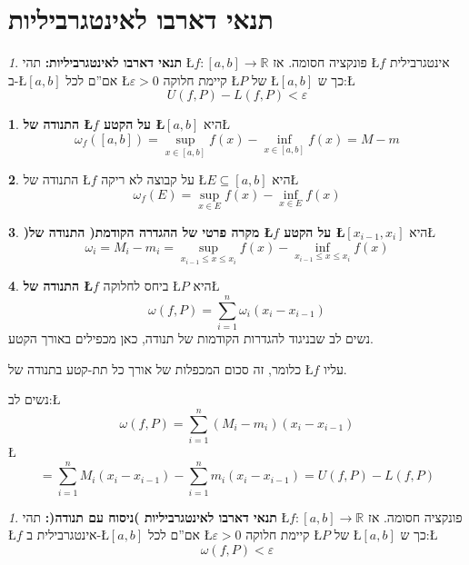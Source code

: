 \documentclass[english,hebrew]{article}
\theoremstyle{remark}
\theoremstyle{definition}
\newtheorem*{defn*}{\protect\definitionname}
\theoremstyle{plain}
\theoremstyle{remark}
\newtheorem{claim}[thm]{\protect\claimname}
\theoremstyle{plain}
\theoremstyle{plain}
\providecommand{\claimname}{טענה}
\providecommand{\definitionname}{הגדרה}
\begin{document}
\section{תנאי דארבו לאינטגרביליות}
\begin{claim}
\textbf{תנאי דארבו לאינטגרביליות: }תהי \L{$f:\left[a,b\right]\rightarrow\mathbb{R}$}
פונקציה חסומה. אז \L{$f$} אינטגרבילית ב-\L{$\left[a,b\right]$} אם\textquotedblright ם
לכל \L{$\varepsilon>0$} קיימת חלוקה \L{$P$} של \L{$\left[a,b\right]$}
כך ש:\L{%
\[
U\left(f,P\right)-L\left(f,P\right)<\varepsilon
\]
}%
\end{claim}

\begin{defn*}
\textbf{התנודה של \L{$f$} על הקטע \L{$\left[a,b\right]$}} היא\L{%
\[
\omega_{f}\left(\left[a,b\right]\right)=\underset{x\in\left[a,b\right]}{\sup}f(x)-\underset{x\in\left[a,b\right]}{\inf}f(x)=M-m
\]
}%
\end{defn*}
\begin{defn*}
התנודה של \L{$f$} על קבוצה לא ריקה \L{$E\subseteq\left[a,b\right]$}
היא\L{%
\[
\omega_{f}\left(E\right)=\underset{x\in E}{\sup}f(x)-\underset{x\in E}{\inf}f(x)
\]
}%
\end{defn*}
\begin{defn*}
\textbf{)מקרה פרטי של ההגדרה הקודמת( התנודה של \L{$f$} על הקטע \L{$\left[x_{i-1},x_{i}\right]$}}
היא\L{%
\[
\omega_{i}=M_{i}-m_{i}=\underset{x_{i-1}\le x\le x_{i}}{\sup}f(x)-\underset{x_{i-1}\le x\le x_{i}}{\inf}f(x)
\]
}%
\end{defn*}
\begin{defn*}
\textbf{התנודה של \L{$f$} }ביחס לחלוקה \L{$P$} היא\L{%
\[
\omega\left(f,P\right)=\underset{i=1}{\overset{n}{\sum}}\omega_{i}\left(x_{i}-x_{i-1}\right)
\]
}%
נשים לב שבניגוד להגדרות הקודמות של תנודה, כאן מכפילים באורך הקטע.

כלומר, זה סכום המכפלות של אורך כל תת-קטע בתנודה של \L{$f$} עליו.

נשים לב:\L{%
\[
\omega\left(f,P\right)=\underset{i=1}{\overset{n}{\sum}}\left(M_{i}-m_{i}\right)\left(x_{i}-x_{i-1}\right)
\]
}%
\L{%
\[
=\underset{i=1}{\overset{n}{\sum}}M_{i}\left(x_{i}-x_{i-1}\right)-\underset{i=1}{\overset{n}{\sum}}m_{i}\left(x_{i}-x_{i-1}\right)=U\left(f,P\right)-L\left(f,P\right)
\]
}%
\end{defn*}
\begin{claim}
\textbf{תנאי דארבו לאינטגרביליות )ניסוח עם תנודה(: }תהי \L{$f:\left[a,b\right]\rightarrow\mathbb{R}$}
פונקציה חסומה. אז \L{$f$} אינטגרבילית ב-\L{$\left[a,b\right]$} אם\textquotedblright ם
לכל \L{$\varepsilon>0$} קיימת חלוקה \L{$P$} של \L{$\left[a,b\right]$}
כך ש:\L{%
\[
\omega\left(f,P\right)<\varepsilon
\]
}%
\end{claim}
\end{document}
